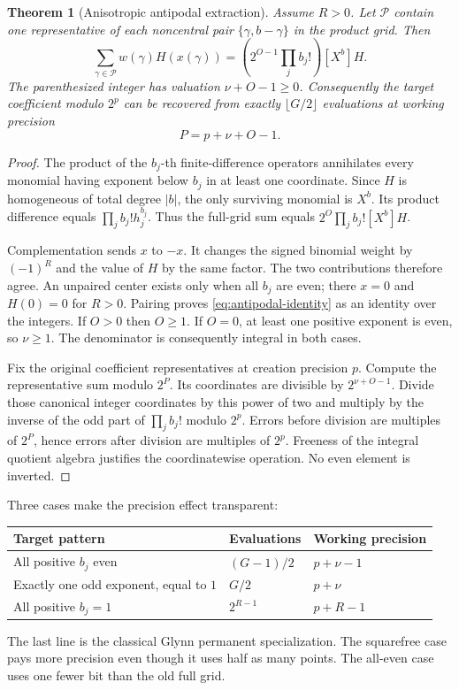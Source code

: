 \documentclass[11pt,letterpaper]{article}
\newtheorem{theorem}{Theorem}[section]
\theoremstyle{definition}\newtheorem{definition}[theorem]{Definition}
\theoremstyle{remark}\newtheorem{remark}[theorem]{Remark}
\begin{document}
\begin{theorem}[Anisotropic antipodal extraction]\label{thm:antipodal}
Assume $R>0$. Let $\mathcal P$ contain one representative of each
noncentral pair $\{\gamma,b-\gamma\}$ in the product grid. Then
\begin{equation}\label{eq:antipodal-identity}
 \sum_{\gamma\in\mathcal P}w(\gamma)H(x(\gamma))
 =\left(2^{O-1}\prod_j b_j!\right)[X^b]H.
\end{equation}
The parenthesized integer has valuation $\nu+O-1\ge0$. Consequently
the target coefficient modulo $2^p$ can be recovered from exactly
$\lfloor G/2\rfloor$ evaluations at working precision
\begin{equation}\label{eq:antipodal-precision}
 P=p+\nu+O-1.
\end{equation}
\end{theorem}
\begin{proof}
The product of the $b_j$-th finite-difference operators annihilates every
monomial having exponent below $b_j$ in at least one coordinate. Since
$H$ is homogeneous of total degree $|b|$, the only surviving monomial is
$X^b$. Its product difference equals $\prod_j b_j!h_j^{b_j}$.
Thus the full-grid sum equals $2^O\prod_j b_j![X^b]H$.

Complementation sends $x$ to $-x$. It changes the signed binomial weight
by $(-1)^R$ and the value of $H$ by the same factor. The two contributions
therefore agree. An unpaired center exists only when all $b_j$ are even;
there $x=0$ and $H(0)=0$ for $R>0$. Pairing proves
\eqref{eq:antipodal-identity} as an identity over the integers.
If $O>0$ then $O\ge1$. If $O=0$, at least one positive exponent is even,
so $\nu\ge1$. The denominator is consequently integral in both cases.

Fix the original coefficient representatives at creation precision $p$.
Compute the representative sum modulo $2^P$. Its coordinates are divisible
by $2^{\nu+O-1}$. Divide those canonical integer coordinates by this
power of two and multiply by the inverse of the odd part of
$\prod_j b_j!$ modulo $2^p$. Errors before division are multiples of
$2^P$, hence errors after division are multiples of $2^p$. Freeness of
the integral quotient algebra justifies the coordinatewise operation.
No even element is inverted.
\end{proof}

Three cases make the precision effect transparent:
\begin{center}
\begin{tabular}{@{}lll@{}}
\toprule Target pattern & Evaluations & Working precision\\\midrule
All positive $b_j$ even & $(G-1)/2$ & $p+\nu-1$\\
Exactly one odd exponent, equal to $1$ & $G/2$ & $p+\nu$\\
All positive $b_j=1$ & $2^{R-1}$ & $p+R-1$\\\bottomrule
\end{tabular}
\end{center}
The last line is the classical Glynn permanent specialization. The squarefree
case pays more precision even though it uses half as many points. The
all-even case uses one fewer bit than the old full grid.
\end{document}
